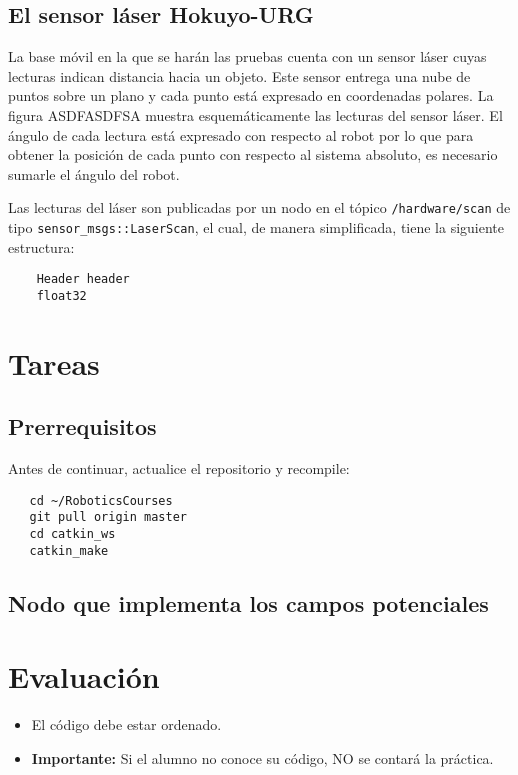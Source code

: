 \documentclass[letterpaper,12pt]{article}
\begin{document}
\subsection{El sensor láser Hokuyo-URG}
La base móvil en la que se harán las pruebas cuenta con un sensor láser cuyas lecturas indican distancia hacia un objeto. Este sensor entrega una nube de puntos sobre un plano y cada punto está expresado en coordenadas polares. La figura ASDFASDFSA muestra esquemáticamente las lecturas del sensor láser. El ángulo de cada lectura está expresado con respecto al robot por lo que para obtener la posición de cada punto con respecto al sistema absoluto, es necesario sumarle el ángulo del robot.

Las lecturas del láser son publicadas por un nodo en el tópico \texttt{/hardware/scan} de tipo \texttt{sensor\_msgs::LaserScan}, el cual, de manera simplificada, tiene la siguiente estructura:
\begin{verbatim}
    Header header
    float32 
\end{verbatim}

\section{Tareas}

\subsection{Prerrequisitos}
Antes de continuar, actualice el repositorio y recompile:
\begin{verbatim}
   cd ~/RoboticsCourses
   git pull origin master
   cd catkin_ws
   catkin_make
\end{verbatim}


\subsection{Nodo que implementa los campos potenciales}

\section{Evaluación}
\begin{itemize}
\item El código debe estar ordenado.
\item \textbf{Importante: } Si el alumno no conoce su código, NO se contará la práctica.
\end{itemize}
\end{document}
